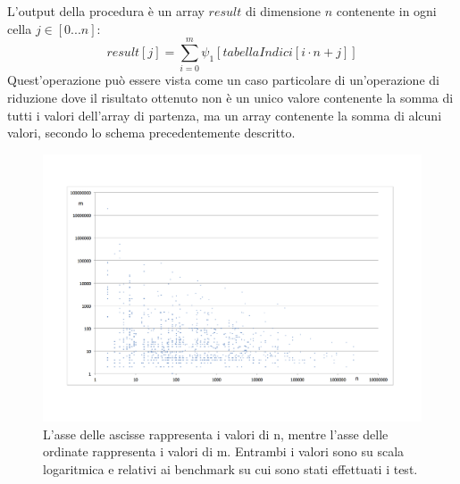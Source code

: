 \documentclass[a4paper]{article}   %
\begin{document}
L'output della procedura è un array $result$ di dimensione $n$ contenente in ogni cella $j \in [0...n]$: %
\begin{equation}
result[ j ] =  \sum_{i=0}^{m} \psi_1 [ tabellaIndici[ i \cdot n + j ] ]
\end{equation}
Quest’operazione può essere vista come un caso particolare di un’operazione di riduzione dove il risultato ottenuto non è un unico valore contenente la somma di tutti i valori dell’array di partenza, ma un array contenente la somma di alcuni valori, secondo lo schema precedentemente descritto.

\begin{figure}[!h]
\includegraphics[scale=0.44]{graficoNM.png}
\caption{L'asse delle ascisse rappresenta i valori di n, mentre l'asse delle ordinate rappresenta i valori di m. Entrambi i valori sono su scala logaritmica e relativi ai benchmark su cui sono stati effettuati i test.}
\label{graficoNM}
\end{figure}
\end{document}
